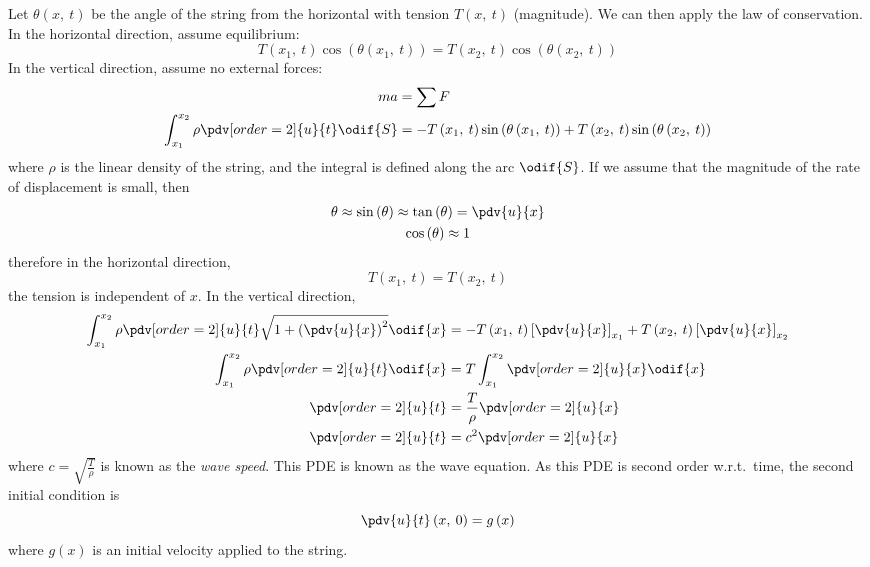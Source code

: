 \documentclass{article}
\begin{document}
Let \(\theta\left( x,\: t \right)\) be the angle of the string from the horizontal with tension \(T\left( x,\: t \right)\) (magnitude).
We can then apply the law of conservation.
In the horizontal direction, assume equilibrium:
\begin{equation*}
    T\left( x_1,\: t \right) \cos{\left( \theta\left( x_1,\: t \right) \right)} = T\left( x_2,\: t \right) \cos{\left( \theta\left( x_2,\: t \right) \right)}
\end{equation*}
In the vertical direction, assume no external forces:
\begin{align*}
    m a                                                & = \sum F                                                                                                                                                     \\
    \int_{x_1}^{x_2} \rho \pdv[order=2]{u}{t} \odif{S} & = -T\left( x_1,\: t \right) \sin{\left( \theta\left( x_1,\: t \right) \right)} + T\left( x_2,\: t \right) \sin{\left( \theta\left( x_2,\: t \right) \right)}
\end{align*}
where \(\rho\) is the linear density of the string, and the integral is defined along the arc \(\odif{S}\).
If we assume that the magnitude of the rate of displacement is small, then
\begin{gather*}
    \theta \approx \sin{\left( \theta \right)} \approx \tan{\left( \theta \right)} = \pdv{u}{x} \\
    \cos{\left( \theta \right)} \approx 1
\end{gather*}
therefore in the horizontal direction,
\begin{equation*}
    T\left( x_1,\: t \right) = T\left( x_2,\: t \right)
\end{equation*}
the tension is independent of \(x\). In the vertical direction,
\begin{align*}
    \int_{x_1}^{x_2} \rho \pdv[order=2]{u}{t} \sqrt{1 + \left( \pdv{u}{x} \right)^2} \odif{x} & = -T\left( x_1,\: t \right) \left[ \pdv{u}{x} \right]_{x_1} + T\left( x_2,\: t \right) \left[ \pdv{u}{x} \right]_{x_2} \\
    \int_{x_1}^{x_2} \rho \pdv[order=2]{u}{t} \odif{x}                                        & = T \int_{x_1}^{x_2} \pdv[order=2]{u}{x} \odif{x}                                                                      \\
    \pdv[order=2]{u}{t}                                                                       & = \frac{T}{\rho} \pdv[order=2]{u}{x}                                                                                   \\
    \pdv[order=2]{u}{t}                                                                       & = c^2 \pdv[order=2]{u}{x}
\end{align*}
where \(c = \sqrt{\frac{T}{\rho}}\) is known as the \textit{wave speed}. This PDE is known as the wave equation.
As this PDE is second order w.r.t.\ time, the second initial condition is
\begin{equation*}
    \pdv{u}{t}\left( x,\: 0 \right) = g\left( x \right)
\end{equation*}
where \(g\left( x \right)\) is an initial velocity applied to the string.
\end{document}
